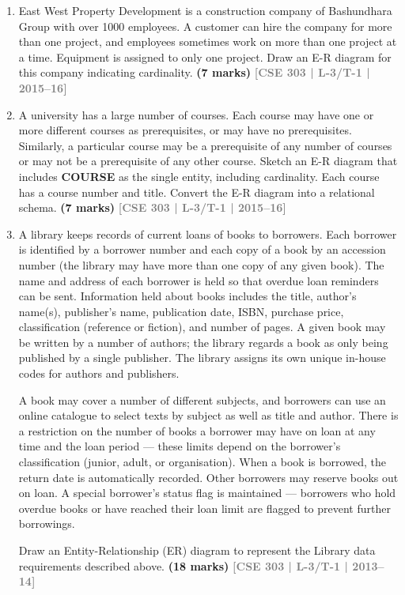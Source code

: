 \documentclass[12pt,a3paper]{article}
\newcommand{\yr}[1]{\hfill\textcolor{gray}{\small\textbf{[#1]}}}
\newcommand{\mk}[1]{\textcolor{orange!70!black}{\small\textbf{(#1 marks)}}}
\begin{document}
\begin{enumerate}
 \yr{CSE 303 | L-3/T-1 | 2011--12}

\item East West Property Development is a construction company of Bashundhara Group with over 1000 employees. A customer can hire the company for more than one project, and employees sometimes work on more than one project at a time. Equipment is assigned to only one project. Draw an E-R diagram for this company indicating cardinality.
\mk{7} \yr{CSE 303 | L-3/T-1 | 2015--16}

\item A university has a large number of courses. Each course may have one or more different courses as prerequisites, or may have no prerequisites. Similarly, a particular course may be a prerequisite of any number of courses or may not be a prerequisite of any other course. Sketch an E-R diagram that includes \textbf{COURSE} as the single entity, including cardinality. Each course has a course number and title. Convert the E-R diagram into a relational schema.
\mk{7} \yr{CSE 303 | L-3/T-1 | 2015--16}

\item A library keeps records of current loans of books to borrowers. Each borrower is identified by a borrower number and each copy of a book by an accession number (the library may have more than one copy of any given book). The name and address of each borrower is held so that overdue loan reminders can be sent. Information held about books includes the title, author's name(s), publisher's name, publication date, ISBN, purchase price, classification (reference or fiction), and number of pages. A given book may be written by a number of authors; the library regards a book as only being published by a single publisher. The library assigns its own unique in-house codes for authors and publishers.

A book may cover a number of different subjects, and borrowers can use an online catalogue to select texts by subject as well as title and author. There is a restriction on the number of books a borrower may have on loan at any time and the loan period --- these limits depend on the borrower's classification (junior, adult, or organisation). When a book is borrowed, the return date is automatically recorded. Other borrowers may reserve books out on loan. A special borrower's status flag is maintained --- borrowers who hold overdue books or have reached their loan limit are flagged to prevent further borrowings.

Draw an Entity-Relationship (ER) diagram to represent the Library data requirements described above.
\mk{18} \yr{CSE 303 | L-3/T-1 | 2013--14}


\end{enumerate}
\end{document}
